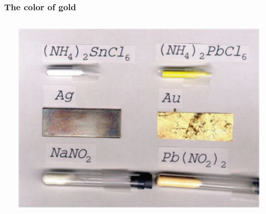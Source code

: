 \documentclass[mathserif,10pt]{beamer}
\begin{document}
\begin{frame}
    \frametitle{The color of gold}
    \begin{columns}
    \begin{column}{.50\textwidth}
	\ \\
    \end{column}
    \begin{column}{.50\textwidth}
	\centering
	\includegraphics[viewport = 0 0 800 550, clip, scale=0.15]{figures/gold.pdf}
    \end{column}
    \end{columns}
\end{frame}
\end{document}
